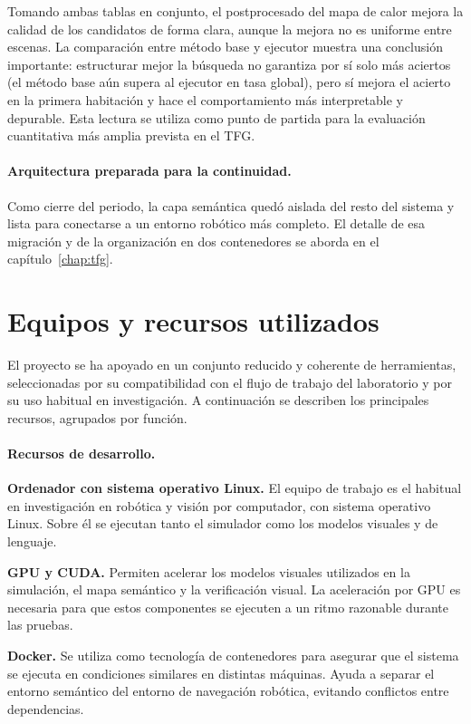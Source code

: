 \documentclass[11pt,fleqn,openany]{book} %
\begin{document}
Tomando ambas tablas en conjunto, el postprocesado del mapa de calor mejora la calidad de los candidatos de forma clara, aunque la mejora no es uniforme entre escenas. La comparación entre método base y ejecutor muestra una conclusión importante: estructurar mejor la búsqueda no garantiza por sí solo más aciertos (el método base aún supera al ejecutor en tasa global), pero sí mejora el acierto en la primera habitación y hace el comportamiento más interpretable y depurable. Esta lectura se utiliza como punto de partida para la evaluación cuantitativa más amplia prevista en el TFG.

\paragraph{Arquitectura preparada para la continuidad.} Como cierre del periodo, la capa semántica quedó aislada del resto del sistema y lista para conectarse a un entorno robótico más completo. El detalle de esa migración y de la organización en dos contenedores se aborda en el capítulo~\ref{chap:tfg}.

\section{Equipos y recursos utilizados}

El proyecto se ha apoyado en un conjunto reducido y coherente de herramientas, seleccionadas por su compatibilidad con el flujo de trabajo del laboratorio y por su uso habitual en investigación. A continuación se describen los principales recursos, agrupados por función.

\paragraph{Recursos de desarrollo.}

\textbf{Ordenador con sistema operativo Linux.} El equipo de trabajo es el habitual en investigación en robótica y visión por computador, con sistema operativo Linux. Sobre él se ejecutan tanto el simulador como los modelos visuales y de lenguaje.

\textbf{GPU y CUDA.} Permiten acelerar los modelos visuales utilizados en la simulación, el mapa semántico y la verificación visual. La aceleración por GPU es necesaria para que estos componentes se ejecuten a un ritmo razonable durante las pruebas.

\textbf{Docker.} Se utiliza como tecnología de contenedores para asegurar que el sistema se ejecuta en condiciones similares en distintas máquinas. Ayuda a separar el entorno semántico del entorno de navegación robótica, evitando conflictos entre dependencias.
\end{document}
